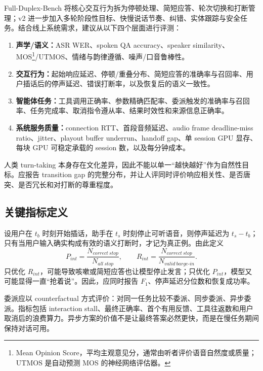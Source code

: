 \documentclass[UTF8,fontset=none,a4paper,10pt]{ctexart}
\begin{document}
Full-Duplex-Bench 将核心交互行为拆为停顿处理、简短应答、轮次切换和打断管理\cite{zh:lin2025fullduplexbench}；v2 进一步加入多轮阶段性目标、快慢说话节奏、纠错、实体跟踪与安全任务\cite{zh:lin2026fullduplexbenchv2}。结合线上系统需求，建议从以下四个层面进行评测：

\begin{enumerate}
  \item \textbf{声学/语义：}ASR WER、spoken QA accuracy、speaker similarity、MOS\footnote{Mean Opinion Score，平均主观意见分，通常由听者评价语音自然度或质量；UTMOS 是自动预测 MOS 的神经网络评估器。}/UTMOS、情绪与韵律遵循、噪声/口音鲁棒性。
  \item \textbf{交互行为：}起始响应延迟、停顿/重叠分布、简短应答的准确率与召回率、用户插话后的停声延迟、错误打断率，以及恢复后的语义一致性。
  \item \textbf{智能体任务：}工具调用正确率、参数精确匹配率、委派触发的准确率与召回率、任务完成率、取消指令遵从率、结果时效性和来源信息正确率。
  \item \textbf{系统服务质量：}connection RTT、首段音频延迟、audio frame deadline-miss ratio、jitter、playout buffer underrun、handoff gap、单 session GPU 显存、每块 GPU 可稳定承载的 session 数，以及每分钟成本。
\end{enumerate}

人类 turn-taking 本身存在文化差异\cite{zh:stivers2009turntaking}，因此不能以单一“越快越好”作为自然性目标。应报告 transition gap 的完整分布，并让人评同时评价响应相关性、是否唐突、是否冗长和对打断的尊重程度。

\subsection{关键指标定义}

设用户在 $t_b$ 时刻开始插话，助手在 $t_s$ 时刻停止可听语音，则停声延迟为 $t_s-t_b$；只有当用户输入确实构成有效的语义打断时，才记为真正例。由此定义
\begin{equation}
P_{int}=\frac{N_{correct\ stop}}{N_{all\ stop}},\qquad
R_{int}=\frac{N_{correct\ stop}}{N_{valid\ barge\mbox{-}in}}.
\end{equation}
只优化 $R_{int}$，可能导致咳嗽或简短应答也让模型停止发言；只优化 $P_{int}$，模型又可能显得一直“抢着说”。因此，应同时报告 $F_1$、停声延迟分位数和恢复成功率。

委派应以 counterfactual 方式评价：对同一任务比较不委派、同步委派、异步委派。指标包括 interaction stall、最终正确率、首个有用反馈、工具往返数和用户取消后的浪费算力。异步方案的价值不是让最终答案必然更快，而是在慢任务期间保持对话可用。
\end{document}
